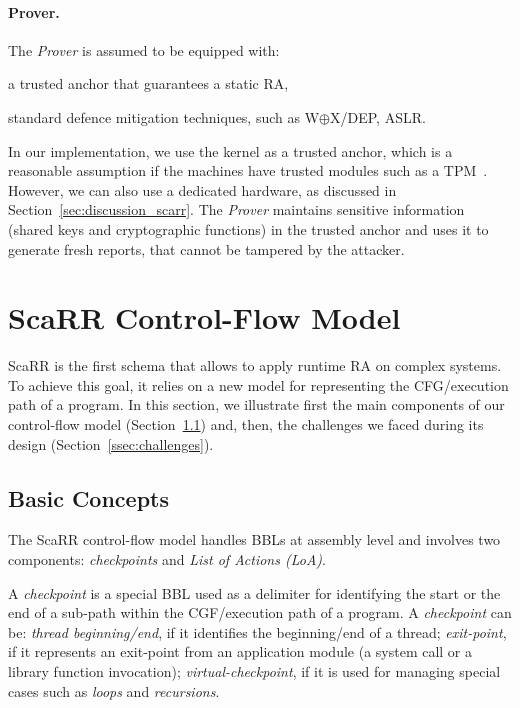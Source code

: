 \paragraph{Prover.}
The \emph{Prover} is assumed to be equipped with:
\begin{enumerate*}[label=(\roman*)]
	\item a trusted anchor that guarantees a static RA,
	\item standard defence mitigation techniques, such as W$\oplus$X/DEP, ASLR.
\end{enumerate*}
In our implementation, we use the kernel as a trusted anchor, which is a 
reasonable assumption if the machines have trusted modules such as a 
TPM~\cite{tomlinson2017introduction}. 
However, we can also use a dedicated hardware, as discussed in 
Section~\ref{sec:discussion_scarr}. The \emph{Prover} maintains sensitive 
information 
(\ie shared keys and cryptographic functions) in the trusted anchor and uses it 
to generate fresh reports, that cannot be tampered by the attacker. 

\section{ScaRR Control-Flow Model}
\label{sec:model}

ScaRR is the first schema that allows to apply runtime RA on complex systems. 
To achieve this goal, it relies on a new model for representing the 
CFG/execution path of a program. In this section, we illustrate first the main 
components of our control-flow model (Section~\ref{ssec:basic_concepts}) and, 
then, the challenges we faced during its design (Section~\ref{ssec:challenges}).

\subsection{Basic Concepts}
\label{ssec:basic_concepts}

The ScaRR control-flow model handles BBLs at assembly level and involves two 
components: \emph{checkpoints} and \emph{List of Actions (LoA)}.


A \emph{checkpoint} is a special BBL used as a delimiter for identifying the 
start or the end of a sub-path within the CGF/execution path of a program. A 
\emph{checkpoint} can be: \emph{thread beginning/end}, if it identifies the 
beginning/end of a thread; \emph{exit-point}, if it represents an exit-point 
from an application module (\eg a system call or a library function 
invocation); \emph{virtual-checkpoint}, if it is used for managing special 
cases such as \emph{loops} and \emph{recursions}. 

